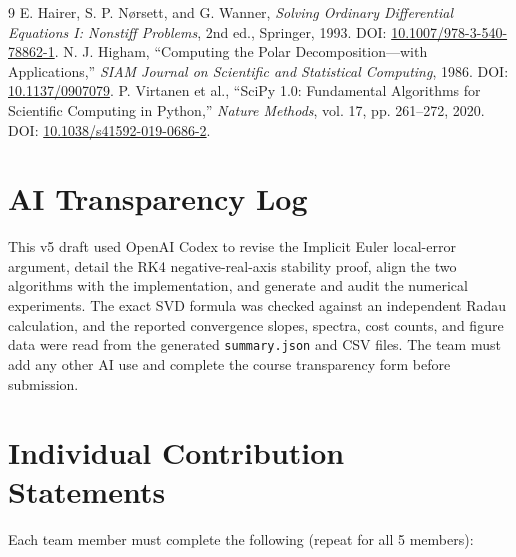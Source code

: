 \documentclass[11pt,a4paper]{article}
\theoremstyle{definition}
\theoremstyle{remark}
\begin{document}
\newpage
\begin{thebibliography}{9}
E. Hairer, S. P. N\o rsett, and G. Wanner,
\emph{Solving Ordinary Differential Equations I: Nonstiff Problems},
2nd ed., Springer, 1993. DOI: \href{https://doi.org/10.1007/978-3-540-78862-1}{10.1007/978-3-540-78862-1}.
N. J. Higham, ``Computing the Polar Decomposition---with Applications,''
\emph{SIAM Journal on Scientific and Statistical Computing}, 1986.
DOI: \href{https://doi.org/10.1137/0907079}{10.1137/0907079}.
P. Virtanen et al., ``SciPy 1.0: Fundamental Algorithms for Scientific Computing in Python,''
\emph{Nature Methods}, vol. 17, pp. 261--272, 2020.
DOI: \href{https://doi.org/10.1038/s41592-019-0686-2}{10.1038/s41592-019-0686-2}.
\end{thebibliography}

\newpage
\appendix
\section{AI Transparency Log}

This v5 draft used OpenAI Codex to revise the Implicit Euler local-error
argument, detail the RK4 negative-real-axis stability proof, align the
two algorithms with the implementation, and generate and audit the
numerical experiments. The exact SVD formula was checked against an
independent Radau calculation, and the reported convergence slopes,
spectra, cost counts, and figure data were read from the generated
\texttt{summary.json} and CSV files. The team must add any other AI use
and complete the course transparency form before submission.

\section{Individual Contribution Statements}

Each team member must complete the following (repeat for all 5 members):
\end{document}
